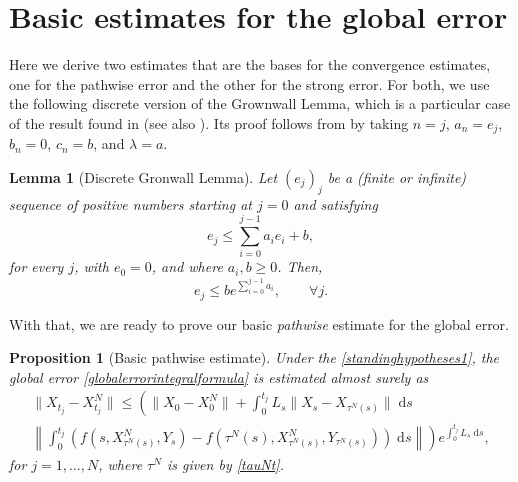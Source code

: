 \documentclass[reqno,12pt]{amsart}
\theoremstyle{plain} %
\newtheorem{lemma}{Lemma}[section]
\newtheorem{proposition}{Proposition}[section]
\theoremstyle{definition} %
\begin{document}
\section{Basic estimates for the global error}

Here we derive two estimates that are the bases for the convergence estimates, one for the pathwise error and the other for the strong error. For both, we use the following discrete version of the Grownwall Lemma, which is a particular case of the result found in \cite{GiraultRaviart1981} (see also \cite{Clark1987}). Its proof follows from \cite[Lemma V.2.4]{GiraultRaviart1981} by taking $n = j$, $a_n = e_j$, $b_n = 0$, $c_n = b$, and $\lambda = a$.

\begin{lemma}[Discrete Gronwall Lemma]
    \label{lemdiscretegronwall}
    Let $(e_j)_j$ be a (finite or infinite) sequence of positive numbers starting at $j=0$ and satisfying
    \begin{equation}
        \label{integralgronwall}
        e_j \leq \sum_{i=0}^{j-1} a_i e_i + b,
    \end{equation}
    for every $j$, with $e_0 = 0$, and where $a_i, b \geq 0$. Then,
    \begin{equation}
        \label{estimateintegralgronwall}
        e_j \leq b e^{\sum_{i=0}^{j-1} a_i}, \qquad \forall j.
    \end{equation}
\end{lemma}

With that, we are ready to prove our basic \emph{pathwise} estimate for the global error.
\begin{proposition}[Basic pathwise estimate]
    \label{propbasicpathwiseestimate}
    Under the \cref{standinghypotheses1}, the global error \eqref{globalerrorintegralformula} is estimated almost surely as
    \begin{multline}
        \label{Etjbasicbound}
            \|X_{t_j} - X_{t_j}^N\| \leq \left( \|X_0 - X_0^N\| + \int_0^{t_j} L_s\|X_s - X_{\tau^N(s)}\| \;\mathrm{d}s \right. \\
            \left. \left\|\int_0^{t_j} \left( f(s, X_{\tau^N(s)}^N, Y_s) - f(\tau^N(s), X_{\tau^N(s)}^N, Y_{\tau^N(s)}) \right)\;\mathrm{d}s\right\|\right) e^{\int_0^{t_j} L_s\;\mathrm{d}s},
    \end{multline}
    for $j=1, \ldots, N$, where $\tau^N$ is given by \eqref{tauNt}.
\end{proposition}
\end{document}
